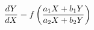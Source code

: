 \documentclass[preview]{standalone}
\begin{document}
\begin{align*}
\special{dvisvgm:raw <g id='unique000'>}\frac{dY}{dX} = f\left( \frac{a_1 X + b_1 Y}{a_2 X + b_2 Y} \right)\special{dvisvgm:raw </g>}
\end{align*}
\end{document}
